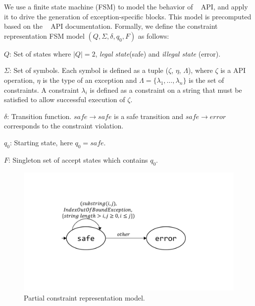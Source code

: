 
  We use a finite state machine
(FSM) to model the behavior of \java\  API, and apply it to drive
the generation of exception-specific  blocks. This model is
precomputed based on the \java\  API documentation. Formally, we
define the constraint representation FSM model $(Q, \Sigma, \delta, q_0, F)$ as
follows:
\begin{mybullet}
 \item $Q$: Set of states where $|Q| = 2$, \emph{legal state}(safe) and
\emph{illegal state} (error).

 \item $\Sigma$: Set of symbols. Each symbol is defined as a tuple ($\zeta$,
$\eta$, $\Lambda$), where $\zeta$ is a  API operation, $\eta$ is
the type of an exception and $\Lambda = \{\lambda_1, \ldots, \lambda_n\}$  is
the set of constraints. A constraint $\lambda_i$ is defined as a constraint on
a string that must be satisfied to allow successful execution of $\zeta$.

 \item $\delta$: Transition function. $safe \rightarrow safe$ is a safe
transition and $safe \rightarrow error$ corresponds to the constraint violation.

 \item $q_0$: Starting state, here $q_0 = safe$.

 \item $F$: Singleton set of accept states which contains $q_0$.
\end{mybullet}

\begin{figure}[t]
\centering
\includegraphics[scale=.25]{images/automataString.pdf}
\caption{Partial constraint representation model.}
\label{fig:constraintautomata}
\end{figure}


